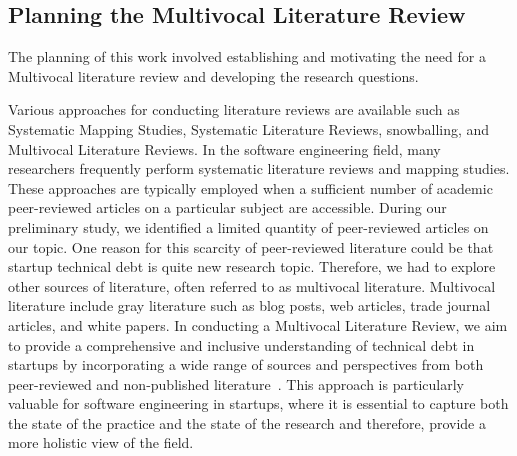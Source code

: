 \subsection*{Planning the Multivocal Literature Review}
The planning of this work involved establishing and motivating the need for a Multivocal literature review and developing the research questions.  

Various approaches for conducting literature reviews are available such as Systematic Mapping Studies, Systematic Literature Reviews, snowballing, and Multivocal Literature Reviews.
In the software engineering field, many researchers frequently perform systematic literature reviews and mapping studies.
These approaches are typically employed when a sufficient number of academic peer-reviewed articles on a particular subject are accessible.
During our preliminary study, we identified a limited quantity of peer-reviewed articles on our topic.
One reason for this scarcity of peer-reviewed literature could be that startup technical debt is quite new research topic.
Therefore, we had to explore other sources of literature, often referred to as multivocal literature.
Multivocal literature include gray literature such as blog posts, web articles, trade journal articles, and white papers.
In conducting a Multivocal Literature Review, we aim to provide a comprehensive and inclusive understanding of technical debt in startups by incorporating a wide range of sources and perspectives from both peer-reviewed and non-published literature~\cite{Ogawa91, Garousi2016/2915970.2916008}.
This approach is particularly valuable for software engineering in startups, where it is essential to capture both the state of the practice and the state of the research and therefore, provide a more holistic view of the field. 

